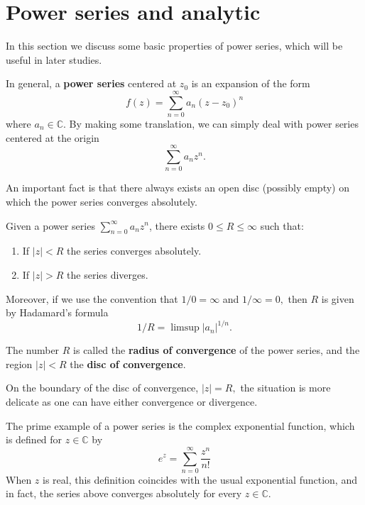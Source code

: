 \documentclass{chapter}
\begin{document}
        \section{Power series and analytic}\label{section: power series and analytic}
            In this section we discuss some basic properties of power series, which will be useful in later studies.

            \bigskip
            In general, a \textbf{power series} centered at $z_{0}$ is an expansion of the form \[f(z)=\sum_{n=0}^{\infty} a_{n}\left(z-z_{0}\right)^{n}\] where $a_n\in\mathbb{C}$. By making some translation, we can simply deal with power series centered at the origin \[\sum_{n=0}^{\infty} a_{n} z^{n}.\] 
            
            An important fact is that there always exists an open disc (possibly empty) on which the power series converges absolutely.

            \begin{theorem}
                Given a power series $\sum_{n=0}^{\infty} a_{n} z^{n}$, there exists $0 \leq R \leq \infty$ such that:

                \begin{enumerate}
                    \item If $|z|<R$ the series converges absolutely.
                    \item If $|z|>R$ the series diverges.
                \end{enumerate}

                Moreover, if we use the convention that $1 / 0=\infty$ and $1 / \infty=0,$ then $R$ is given by Hadamard's formula \[1 / R=\limsup \left|a_{n}\right|^{1 / n}.\]
            \end{theorem}

            The number $R$ is called the \textbf{radius of convergence} of the power series, and the region $|z|<R$ the \textbf{disc of convergence}.

            \begin{remark}
                On the boundary of the disc of convergence, $|z|=R,$ the situation is more delicate as one can have either convergence or divergence.
            \end{remark}

            \begin{example}
                The prime example of a power series is the complex exponential function, which is defined for $z \in \mathbb{C}$ by \[e^{z}=\sum_{n=0}^{\infty} \frac{z^{n}}{n !}\]
                When $z$ is real, this definition coincides with the usual exponential function, and in fact, the series above converges absolutely for every $z \in \mathbb{C}$.
            \end{example}
\end{document}
